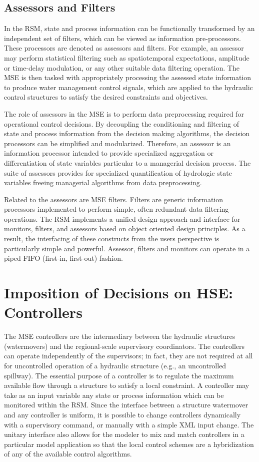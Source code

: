 \subsection{Assessors and Filters}
In the RSM, state and process information can be functionally
transformed by an independent set of filters, which can be viewed as
information pre-processors. These processors are denoted as assessors
and filters. For example, an assessor may perform statistical
filtering such as spatiotemporal expectations, amplitude or time-delay
modulation, or any other suitable data filtering operation. The MSE is
then tasked with appropriately processing the assessed state
information to produce water management control signals, which are
applied to the hydraulic control structures to satisfy the desired
constraints and objectives.  

The role of assessors in the MSE is to perform data preprocessing
required for operational control decisions. By decoupling the
conditioning and filtering of state and process information from the
decision making algorithms, the decision processors can be simplified
and modularized. Therefore, an assessor is an information processor
intended to provide specialized aggregation or differentiation of
state variables particular to a managerial decision process. The suite
of assessors provides for specialized quantification of hydrologic
state variables freeing managerial algorithms from data preprocessing.

Related to the assessors are MSE filters. Filters are generic
information processors implemented to perform simple, often redundant
data filtering operations. The RSM implements a unified design
approach and interface for monitors, filters, and assessors based on
object oriented design principles. As a result, the interfacing of
these constructs from the users perspective is particularly simple and
powerful. Assessor, filters and monitors can operate in a piped FIFO
(first-in, first-out) fashion.

\section{Imposition of Decisions on HSE: Controllers}
The MSE controllers are the intermediary between the hydraulic
structures (watermovers) and the regional-scale supervisory
coordinators. The controllers can operate independently of the
supervisors; in fact, they are not required at all for uncontrolled
operation of a hydraulic structure (e.g., an uncontrolled
spillway). The essential purpose of a controller is to regulate the
maximum available flow through a structure to satisfy a local
constraint. A controller may take as an input variable any state or
process information which can be monitored within the RSM. Since the
interface between a structure watermover and any controller is
uniform, it is possible to change controllers dynamically with a
supervisory command, or manually with a simple XML input change. The
unitary interface also allows for the modeler to mix and match
controllers in a particular model application so that the local
control schemes are a hybridization of any of the available control
algorithms.


